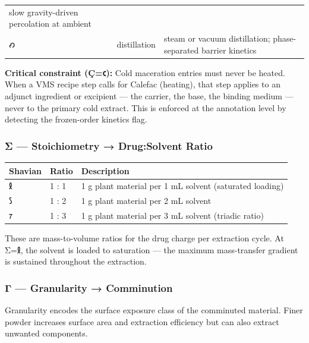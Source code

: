 \documentclass[12pt,a4paper]{article}
\begin{document}
\begin{longtable}[]{@{}lll@{}}
\begin{minipage}[t]{0.30\columnwidth}
slow gravity-driven percolation at ambient\strut
\end{minipage}\tabularnewline
\begin{minipage}[t]{0.30\columnwidth}\raggedright
𐑺\strut
\end{minipage} & \begin{minipage}[t]{0.30\columnwidth}\raggedright
distillation\strut
\end{minipage} & \begin{minipage}[t]{0.30\columnwidth}\raggedright
steam or vacuum distillation; phase-separated barrier kinetics\strut
\end{minipage}\tabularnewline
\bottomrule
\end{longtable}

\textbf{Critical constraint (Ç=𐑤):} Cold maceration entries must never
be heated. When a VMS recipe step calls for Calefac (heating), that step
applies to an adjunct ingredient or excipient --- the carrier, the base,
the binding medium --- never to the primary cold extract. This is
enforced at the annotation level by detecting the frozen-order kinetics
flag.

\hypertarget{ux3c3-stoichiometry-drugsolvent-ratio}{%
\subsubsection{Σ --- Stoichiometry → Drug:Solvent
Ratio}\label{ux3c3-stoichiometry-drugsolvent-ratio}}

\begin{longtable}[]{@{}lll@{}}
\toprule
Shavian & Ratio & Description\tabularnewline
\midrule
\endhead
𐑙 & 1 : 1 & 1 g plant material per 1 mL solvent (saturated
loading)\tabularnewline
𐑕 & 1 : 2 & 1 g plant material per 2 mL solvent\tabularnewline
𐑳 & 1 : 3 & 1 g plant material per 3 mL solvent (triadic
ratio)\tabularnewline
\bottomrule
\end{longtable}

These are mass-to-volume ratios for the drug charge per extraction
cycle. At Σ=𐑙, the solvent is loaded to saturation --- the maximum
mass-transfer gradient is sustained throughout the extraction.

\hypertarget{ux3b3-granularity-comminution}{%
\subsubsection{Γ --- Granularity →
Comminution}\label{ux3b3-granularity-comminution}}

Granularity encodes the surface exposure class of the comminuted
material. Finer powder increases surface area and extraction efficiency
but can also extract unwanted components.
\end{document}
